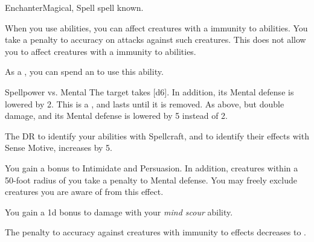     \begin{feat}{Enchanter}{Magical, Spell}
        \featpre {} spell known.
        \featben

         When you use  abilities, you can affect creatures with a  immunity to  abilities.
        You take a  penalty to accuracy on attacks against such creatures.
        This does not allow you to affect creatures with a  immunity to  abilities.

         As a , you can spend an  to use this ability.
        \begin{ability}
            \begin{spelltargetinginfo}
            \end{spelltargetinginfo}
            \begin{spelleffects}
                \begin{spellattack}{Spellpower vs. Mental} %
                    \spellsuccess The target takes [d6].
                    In addition, its Mental defense is lowered by 2.
                    This is a , and lasts until it is removed.
                    \spellcritical As above, but double damage, and its Mental defense is lowered by 5 instead of 2.
                \end{spellattack}
            \end{spelleffects}
        \end{ability}

         The DR to identify your  abilities with Spellcraft, and to identify their effects with Sense Motive, increases by 5.

         You gain a  bonus to Intimidate and Persuasion.
        In addition, creatures within a 50-foot radius  of you take a  penalty to Mental defense.
        You may freely exclude creatures you are aware of from this effect.

         You gain a \plus1d bonus to damage with your \textit{mind scour} ability. 

         The penalty to accuracy against creatures with  immunity to  effects decreases to .


\end{feat}
